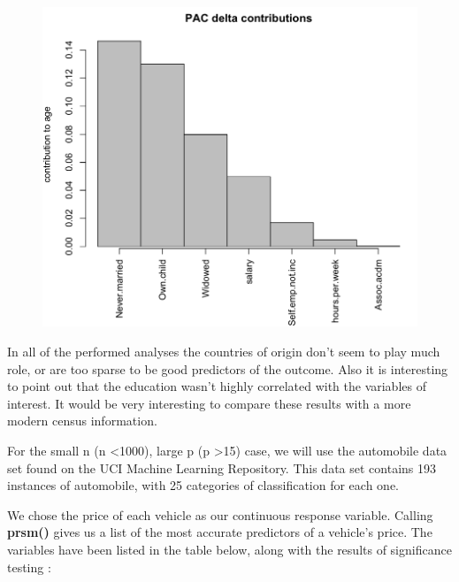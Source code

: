 \documentclass[letter]{article}
\begin{document}
\begin{figure}
\includegraphics[scale=0.5]{figures/ageContrib.png}
\caption{}
 \label{fig:ageContrib}
\end{figure}

In all of the performed analyses the countries of origin don't seem to play much role, or are too sparse to be good predictors of the outcome. Also it is interesting to point out that the education wasn't highly correlated with the variables of interest. It would be very interesting to compare these results with a more modern census information.

\newpage

For the small n (n \textless 1000), large p (p \textgreater 15) case, we will use the automobile data set found on the UCI Machine Learning Repository.  This data set contains 193 instances of automobile, with 25 categories of classification for each one.

We chose the price of each vehicle as our continuous response variable.  Calling \textbf{prsm()} gives us a list of the most accurate predictors of a vehicle's price.  The variables have been listed in the table below, along with the results of significance testing : \\
\end{document}
